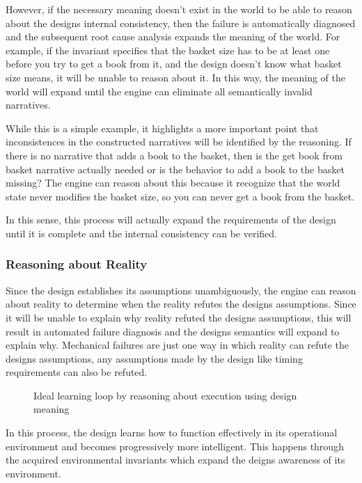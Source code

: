 However, if the necessary meaning doesn't exist in the world to be able to reason about the designs internal consistency, then the failure is automatically diagnosed and the subsequent root cause analysis expands the meaning of the world. For example, if the invariant specifies that the basket size has to be at least one before you try to get a book from it, and the design doesn't know what basket size means, it will be unable to reason about it. In this way, the meaning of the world will expand until the engine can eliminate all semantically invalid narratives.

While this is a simple example, it highlights a more important point that inconsistences in the constructed narratives will be identified by the reasoning. If there is no narrative that adds a book to the basket, then is the get book from basket narrative actually needed or is the behavior to add a book to the basket missing? The engine can reason about this because it recognize that the world state never modifies the basket size, so you can never get a book from the basket. 

In this sense, this process will actually expand the requirements of the design until it is complete and the internal consistency can be verified.

\subsubsection{Reasoning about Reality}

Since the design establishes its assumptions unambiguously, the engine can reason about reality to determine when the reality refutes the designs assumptions. Since it will be unable to explain why reality refuted the designs assumptions, this will result in automated failure diagnosis and the designs semantics will expand to explain why. Mechanical failures are just one way in which reality can refute the designs assumptions, any assumptions made by the design like timing requirements can also be refuted.

\begin{figure}[htbp]
    \centering
    
    \caption{Ideal learning loop by reasoning about execution using design meaning}
    \label{fig:ideal_learning}
\end{figure}

In this process, the design learns how to function effectively in its operational environment and becomes progressively more intelligent. This happens through the acquired environmental invariants which expand the deigns awareness of its environment.

